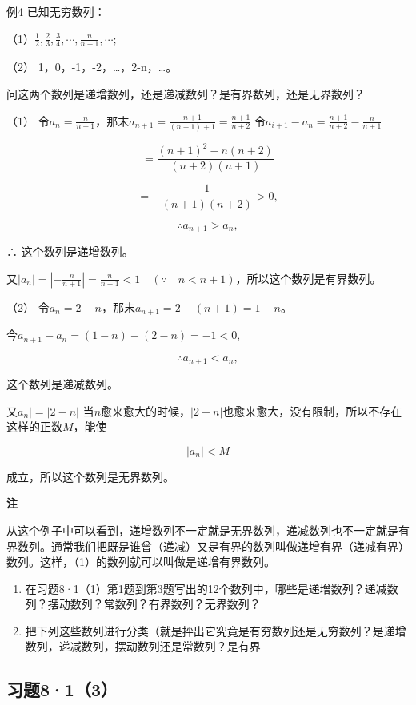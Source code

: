例4 已知无穷数列：

（1）\(\frac{1}{2}, \frac{2}{3}, \frac{3}{4}, \cdots, \frac{n}{n+1}, \cdots;\)

（2） 1，0，-1，-2，\ldots，2-n，\ldots。

问这两个数列是递增数列，还是递减数列？是有界数列，还是无界数列？

 （1）
令\(a_{n} = \frac{n}{n + 1}\)，那末\(a_{n + 1} = \frac{n + 1}{(n + 1) + 1} = \frac{n + 1}{n + 2}\)
令\(a_{i + 1} - a_n = \frac{n + 1}{n + 2} -\frac{n}{n + 1}\)

\[
= \frac{(n + 1)^{2} - n (n + 2)}{(n + 2) (n + 1)}
\]

\[
= - \frac{1}{(n + 1) (n + 2)} > 0,
\]

\[
\therefore a_{n + 1} > a_{n},
\]

∴ 这个数列是递增数列。

又\(|a_{n}| = \left|-\frac{n}{n + 1}\right| = \frac{n}{n + 1} < 1\quad (\because \quad n < n + 1)\)，所以这个数列是有界数列。

（2） 令\(a_{n} = 2 - n\)，那末\(a_{n+1} = 2 - (n+1) = 1 - n\)。

今\(a_{n + 1} - a_n = (1 - n) - (2 - n) = -1 < 0,\)

\[
\therefore a_{n + 1} < a_{n},
\]

这个数列是递减数列。

又\(a_{n}| = |2 - n|\)
当\(n\)愈来愈大的时候，\(|2 - n|\)也愈来愈大，没有限制，所以不存在这样的正数\(M\)，能使

\[
\left| a_{n} \right| < M
\]

成立，所以这个数列是无界数列。

\textbf{注}

从这个例子中可以看到，递增数列不一定就是无界数列，递减数列也不一定就是有界数列。通常我们把既是谁曾（递减）又是有界的数列叫做递增有界（递减有界）数列。这样，（1）的数列就可以叫做是递增有界数列。

\begin{enumerate}
\item
  在习题8·1（1）第1题到第3题写出的12个数列中，哪些是递增数列？递减数列？摆动数列？常数列？有界数列？无界数列？
\item
  把下列这些数列进行分类（就是抨出它究竟是有穷数列还是无穷数列？是递增数列，递减数列，摆动数列还是常数列？是有界
\end{enumerate}

\subsection{习题8·1（3）}

